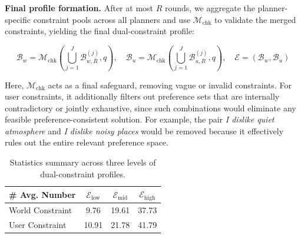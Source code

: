 \noindent\textbf{Final profile formation.}
After at most $R$ rounds, we aggregate the planner-specific constraint pools across all planners and use $\mathcal{M}_{\mathrm{chk}}$ to validate the merged constraints, yielding the final dual-constraint profile:
\begin{footnotesize}
\begin{equation}
\mathcal{B}_{w} = \mathcal{M}_{\mathrm{chk}}(\bigcup_{j=1}^{J}\mathcal{B}^{(j)}_{w,R}, q), \quad
\mathcal{B}_{u} = \mathcal{M}_{\mathrm{chk}}(\bigcup_{j=1}^{J}\mathcal{B}^{(j)}_{u,R}, q), \quad
\mathcal{E}=(\mathcal{B}_{w},\mathcal{B}_{u})
\end{equation}
\end{footnotesize}
Here, $\mathcal{M}_{\mathrm{chk}}$ acts as a final safeguard, removing vague or invalid constraints. For user constraints, it additionally filters out preference sets that are internally contradictory or jointly exhaustive, since such combinations would eliminate any feasible preference-consistent solution. For example, the pair \textit{I dislike quiet atmosphere} and \textit{I dislike noisy places} would be removed because it effectively rules out the entire relevant preference space.


\begin{table}
\centering
\vspace{-0.05in}
\small
\begin{tabular}{l ccc}
\toprule
\textbf{\# Avg. Number} & \textbf{$\mathcal{E}_{\mathrm{low}}$} & \textbf{$\mathcal{E}_{\mathrm{mid}}$} & \textbf{$\mathcal{E}_{\mathrm{high}}$} \\
\midrule
World Constraint & 9.76 & 19.61 & 37.73 \\
User Constraint & 10.91 & 21.78 & 41.79 \\
\bottomrule
\end{tabular}
\vspace{-2mm}
\caption{Statistics summary across three levels of dual-constraint profiles.}
\vspace{-4mm}
\label{tab:benchmark-stats}
\end{table}


